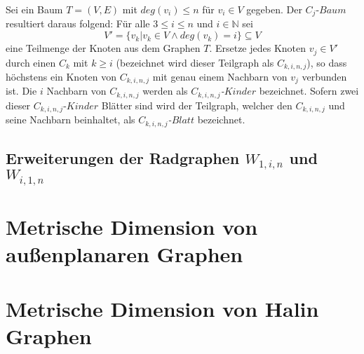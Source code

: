 \begin{defi}
Sei ein Baum $T=(V,E)$ mit $deg(v_i)\leq n$ für $v_i \in V$ gegeben. Der $C_j$-$Baum$ resultiert daraus folgend: 
   Für alle $3 \leq i \leq n$ und $i \in \mathbb{N}$ sei $$V'=\{v_k|v_k \in V \wedge deg(v_k)=i\}\subseteq V$$ eine Teilmenge der Knoten aus dem Graphen $T$. Ersetze jedes Knoten $v_j \in V'$ durch einen $C_k$ mit $k \geq i$ (bezeichnet wird dieser Teilgraph als \emph{$C_{k,i,n,j}$}), so dass höchstens ein Knoten von $C_{k,i,n,j}$ mit genau einem Nachbarn von $v_j$ verbunden ist. Die $i$ Nachbarn von $C_{k,i,n,j}$ werden als \emph{$C_{k,i,n,j}$-$Kinder$} bezeichnet. Sofern zwei dieser $C_{k,i,n,j}$-$Kinder$ Blätter sind wird der Teilgraph, welcher den $C_{k,i,n,j}$ und seine Nachbarn beinhaltet, als \emph{$C_{k,i,n,j}$-$Blatt$} bezeichnet.
\end{defi}

\begin{satz}
\end{satz}
\subsection{Erweiterungen der Radgraphen $W_{1,i,n}$ und $W_{i,1,n}$}
\section{Metrische Dimension von außenplanaren Graphen%
}

\section{Metrische Dimension von Halin Graphen}
